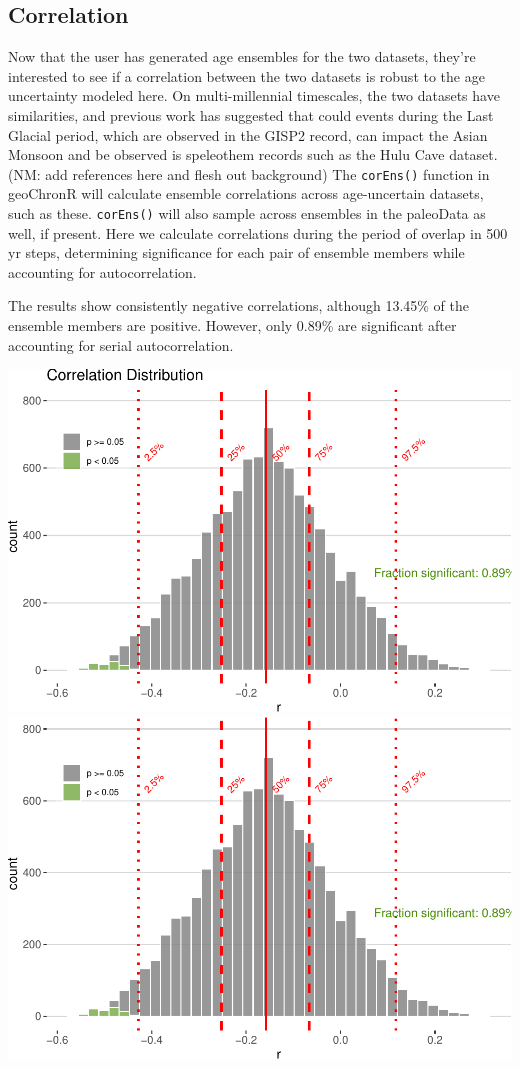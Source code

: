 \documentclass[gc, manuscript]{copernicus}
\begin{document}
\subsection{Correlation}

Now that the user has generated age ensembles for the two datasets,
they're interested to see if a correlation between the two datasets is
robust to the age uncertainty modeled here. On multi-millennial
timescales, the two datasets have similarities, and previous work has
suggested that could events during the Last Glacial period, which are
observed in the GISP2 record, can impact the Asian Monsoon and be
observed is speleothem records such as the Hulu Cave dataset. (NM: add
references here and flesh out background) The \texttt{corEns()} function
in geoChronR will calculate ensemble correlations across age-uncertain
datasets, such as these. \texttt{corEns()} will also sample across
ensembles in the paleoData as well, if present. Here we calculate
correlations during the period of overlap in 500 yr steps, determining
significance for each pair of ensemble members while accounting for
autocorrelation.

The results show consistently negative correlations, although 13.45\% of
the ensemble members are positive. However, only 0.89\% are significant
after accounting for serial autocorrelation.

\includegraphics{geoChronR-paper_files/figure-latex/unnamed-chunk-7-1.pdf}
\includegraphics{geoChronR-paper_files/figure-latex/unnamed-chunk-7-2.pdf}
\end{document}
